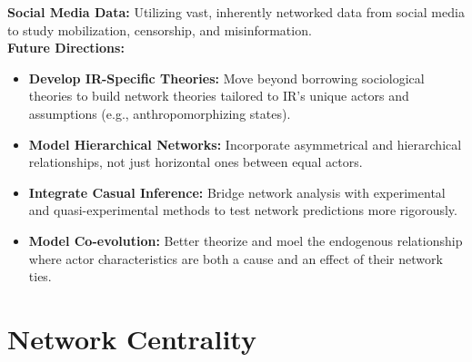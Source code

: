 \documentclass{article}
\begin{document}
    \noindent \textbf{Social Media Data:} Utilizing vast, inherently
networked data from social media to study mobilization, censorship, and
misinformation.\\

    \noindent \textbf{Future Directions:}
    \begin{itemize}
        \item \textbf{Develop IR-Specific Theories:} Move beyond borrowing
        sociological theories to build network theories tailored to IR's
        unique actors and assumptions (e.g., anthropomorphizing states).
        \item \textbf{Model Hierarchical Networks:} Incorporate asymmetrical
        and hierarchical relationships, not just horizontal ones between
        equal actors.
        \item \textbf{Integrate Casual Inference:} Bridge network analysis
        with experimental and quasi-experimental methods to test network
        predictions more rigorously.
        \item \textbf{Model Co-evolution:} Better theorize and moel the
        endogenous relationship where actor characteristics are both a cause
        and an effect of their network ties.
    \end{itemize}


    \section{Network Centrality}
\end{document}
